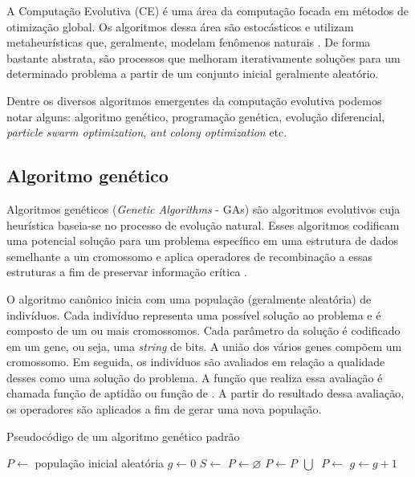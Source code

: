 A Computação Evolutiva (CE) é uma área da computação focada em métodos de otimização global. Os algoritmos dessa área são estocásticos e utilizam metaheurísticas que, geralmente, modelam fenômenos naturais \cite{michalewicz1995heuristic}. De forma bastante abstrata, são processos que melhoram iterativamente soluções para um determinado problema a partir de um conjunto inicial geralmente aleatório.

Dentre os diversos algoritmos emergentes da computação evolutiva podemos notar alguns: algoritmo genético, programação genética, evolução diferencial, \textit{particle swarm optimization}, \textit{ant colony optimization} etc.

\subsection{Algoritmo genético}

Algoritmos genéticos (\textit{Genetic Algorithms} - GAs) são algoritmos evolutivos cuja heurística baseia-se no processo de evolução natural. Esses algoritmos codificam uma potencial solução para um problema específico em uma estrutura de dados semelhante a um cromossomo e aplica operadores de recombinação a essas estruturas a fim de preservar informação crítica \cite{whitley1994genetic}.

O algoritmo canônico inicia com uma população (geralmente aleatória) de indivíduos. Cada indivíduo representa uma possível solução ao problema e é composto de um ou mais cromossomos. Cada parâmetro da solução é codificado em um gene, ou seja, uma \textit{string} de bits. A união dos vários genes compõem um cromossomo. Em seguida, os indivíduos são avaliados em relação a qualidade desses como uma solução do problema. A função que realiza essa avaliação é chamada função de aptidão ou função de \fitness. A partir do resultado dessa avaliação, os operadores são aplicados a fim de gerar uma nova população.

\begin{algorithm}[h]
    \caption{Pseudocódigo de um algoritmo genético padrão}
    \begin{algorithmic}
        \State $P \gets $ população inicial aleatória
        \State $g \gets 0$
            \State {}
            \State $S \gets$ 
            \State $P \gets \varnothing$
                \State $P \gets P \>\> \bigcup \>$ 
            \EndFor
            \State $P \gets $ 
            \State $g \gets g + 1$
        \EndWhile
    \end{algorithmic}
\end{algorithm}

